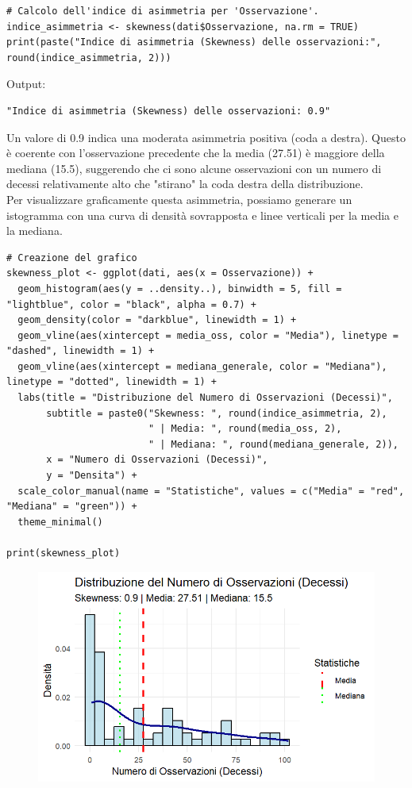 \documentclass[14pt, openany, titlepage]{report} %
\begin{document}
\begin{center}
\begin{lstlisting}[breaklines=true]
# Calcolo dell'indice di asimmetria per 'Osservazione'.
indice_asimmetria <- skewness(dati$Osservazione, na.rm = TRUE)
print(paste("Indice di asimmetria (Skewness) delle osservazioni:", round(indice_asimmetria, 2)))
\end{lstlisting}
\end{center}
\noindent
Output:
\begin{verbatim}
"Indice di asimmetria (Skewness) delle osservazioni: 0.9"
\end{verbatim}
Un valore di 0.9 indica una moderata asimmetria positiva
(coda a destra). Questo è coerente con l'osservazione precedente
che la media (27.51) è maggiore della mediana (15.5), suggerendo 
che ci sono alcune osservazioni con un numero di decessi relativamente
alto che "stirano" la coda destra della distribuzione.\\

\noindent
Per visualizzare graficamente questa asimmetria, 
possiamo generare un istogramma con una curva di densità 
sovrapposta e linee verticali per la media e la mediana.

\begin{center}
\begin{lstlisting}[breaklines=true]
# Creazione del grafico
skewness_plot <- ggplot(dati, aes(x = Osservazione)) +
  geom_histogram(aes(y = ..density..), binwidth = 5, fill = "lightblue", color = "black", alpha = 0.7) +
  geom_density(color = "darkblue", linewidth = 1) +
  geom_vline(aes(xintercept = media_oss, color = "Media"), linetype = "dashed", linewidth = 1) +
  geom_vline(aes(xintercept = mediana_generale, color = "Mediana"), linetype = "dotted", linewidth = 1) +
  labs(title = "Distribuzione del Numero di Osservazioni (Decessi)",
       subtitle = paste0("Skewness: ", round(indice_asimmetria, 2), 
                         " | Media: ", round(media_oss, 2), 
                         " | Mediana: ", round(mediana_generale, 2)),
       x = "Numero di Osservazioni (Decessi)",
       y = "Densita") +
  scale_color_manual(name = "Statistiche", values = c("Media" = "red", "Mediana" = "green")) +
  theme_minimal()

print(skewness_plot)
\end{lstlisting}
\end{center}

\begin{figure}[H] 
    \centering
    \includegraphics[width=12cm, height=7cm]{Rplot06.png} 
\end{figure}
\end{document}
